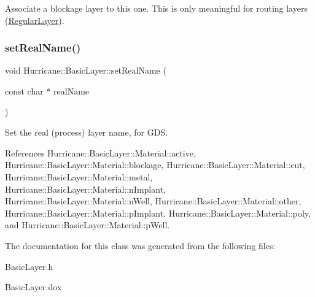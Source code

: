 Associate a blockage layer to this one. This is only meaningful for routing layers (\hyperlink{classHurricane_1_1RegularLayer}{Regular\+Layer}). \mbox{\label{classHurricane_1_1BasicLayer_aa5aa1e1079c14d7e9c05799d14e726af}} 
\subsubsection{\texorpdfstring{set\+Real\+Name()}{setRealName()}}
{\footnotesize\ttfamily void Hurricane\+::\+Basic\+Layer\+::set\+Real\+Name (\begin{DoxyParamCaption}\item[{const char $\ast$}]{real\+Name }\end{DoxyParamCaption})\hspace{0.3cm}{\ttfamily [inline]}}

Set the real (process) layer name, for G\+DS. 

References Hurricane\+::\+Basic\+Layer\+::\+Material\+::active, Hurricane\+::\+Basic\+Layer\+::\+Material\+::blockage, Hurricane\+::\+Basic\+Layer\+::\+Material\+::cut, Hurricane\+::\+Basic\+Layer\+::\+Material\+::metal, Hurricane\+::\+Basic\+Layer\+::\+Material\+::n\+Implant, Hurricane\+::\+Basic\+Layer\+::\+Material\+::n\+Well, Hurricane\+::\+Basic\+Layer\+::\+Material\+::other, Hurricane\+::\+Basic\+Layer\+::\+Material\+::p\+Implant, Hurricane\+::\+Basic\+Layer\+::\+Material\+::poly, and Hurricane\+::\+Basic\+Layer\+::\+Material\+::p\+Well.



The documentation for this class was generated from the following files\+:\begin{DoxyCompactItemize}
\item 
Basic\+Layer.\+h\item 
Basic\+Layer.\+dox\end{DoxyCompactItemize}
